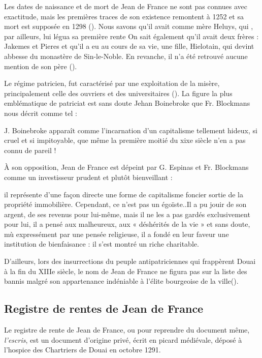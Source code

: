 Les dates de naissance et de mort de Jean de France ne sont pas connues avec exactitude, mais les premières traces de son existence remontent à 1252 et sa mort est supposée en 1298 (\cite{espinas_les_1933}). Nous savons qu'il avait comme mère Heluys, qui , par ailleurs, lui légua sa première rente
On sait également qu'il  avait deux frères : Jakemes et Pieres et qu'il a eu au cours de sa vie, une fille, Hielotain, qui devint abbesse du monastère de Sin-le-Noble. En revanche, il n'a été retrouvé aucune mention de son père (\cite{espinas_les_1933}).

Le régime patricien, fut caractérisé par une exploitation de la misère, principalement celle des ouvriers et des universitaires (\cite{blockmans_trois_1941}). La figure la plus emblématique de patriciat est sans doute Jehan Boinebroke  que Fr. Blockmans nous décrit comme tel :
\begin{displayquote} 
    \og J. Boinebroke apparaît comme l'incarnation d'un capitalisme tellement hideux, si cruel et si impitoyable, que même la première moitié du xixe siècle n'en a pas connu de pareil ! \fg{}
\end{displayquote}
\vspace{0,5cm}
À son opposition, Jean de France est dépeint par G. Espinas et Fr. Blockmans comme un investisseur prudent et plutôt bienveillant :
\begin{displayquote}
    \og [...] il représente d’une façon directe une forme de capitalisme foncier sortie de la propriété immobilière. Cependant, ce n’est pas un égoïste..Il a pu jouir de son argent, de ses revenus pour lui-même, mais il ne les a pas gardés exclusivement pour lui, il a pensé aux malheureux, aux « déshérités de la vie » et sans doute, mù expressément par une pensée religieuse, il a fondé en leur faveur une institution de bienfaisance : il s’est montré un riche charitable.\fg{} 
\end{displayquote} 
\vspace{0,5cm}
D'ailleurs, lors des insurrections du peuple antipatriciennes qui frappèrent Douai à la fin du XIIIe siècle, le nom de Jean de France ne figura pas sur la liste des bannis malgré son appartenance indéniable à l'élite bourgeoise de la ville(\cite{espinas_les_1933}).

\subsection{Registre de rentes de Jean de France}
Le registre de rente de Jean de France, ou pour reprendre du document même, \textit{l'escris}, est un document d'origine privé, écrit en picard médiévale, déposé à l'hospice des Chartriers de Douai en octobre 1291. 


